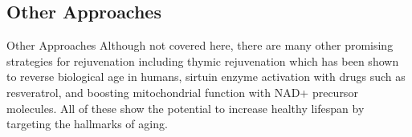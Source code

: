 \subsection{Other Approaches}

\begin{frame}[c]{Other Approaches}
    Although not covered here, there are many other promising strategies for rejuvenation including thymic rejuvenation which has been shown to reverse biological age in humans, sirtuin enzyme activation with drugs such as resveratrol, and boosting mitochondrial function with NAD+ precursor molecules. All of these show the potential to increase healthy lifespan by targeting the hallmarks of aging.
\end{frame}
